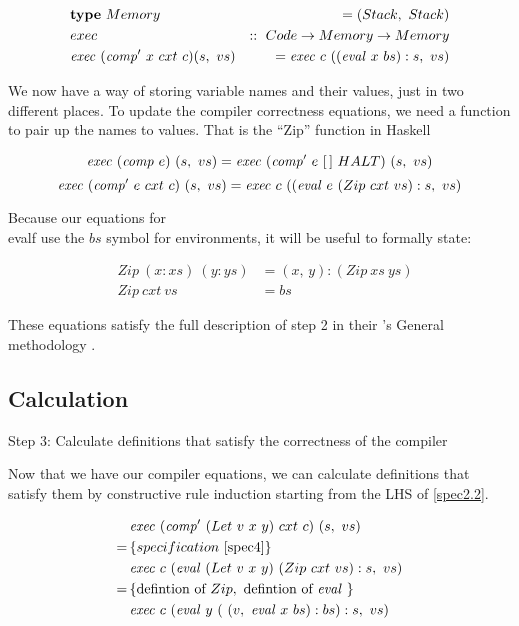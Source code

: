 \documentclass {article}
\begin{document}
\begin{eqnarray}
&\textbf{type}\ Memory\ &= (Stack,\ Stack)\\
&exec &::\ Code \rightarrow Memory \rightarrow Memory \nonumber \\
&\mathit{exec\ } (\mathit{comp'\ }  x\ cxt\ c) (s,\ vs) 
	&= \mathit{exec\ } c\ ((\mathit{eval\ }  x\ bs):s,\ vs) \label{spec4}
\end{eqnarray}

We now have a way of storing variable names
and their values, 
just in two different places.
To update the compiler correctness equations,
we need a function to pair up the names
to values.
That is the ``Zip'' function in Haskell

	\[ \mathit{exec\ } (\mathit{comp\ } e)\ (s,\ vs) 
		= \mathit{exec\ } (\mathit{comp'\ }  e\ [\,]\ HALT)\ (s,\ vs) \]
	\[ \mathit{exec\ } (\mathit{comp'\ }  e\ cxt\ c)\ (s,\ vs) 
		= \mathit{exec\ } c\ ((\mathit{eval\ }  e\ (Zip\ cxt\ vs):s,\ vs) \]

Because our equations for \\evalf 
use the $bs$ symbol for environments,
it will be useful to formally state:

\begin{eqnarray}
&Zip\ (x:xs)\ (y:ys) &= (x,\, y):(Zip\ xs\ ys)  \\ \label{ziden}
&Zip\ cxt\ vs &= bs \label{zcxtvs}
\end{eqnarray}
	
These equations satisfy the full description
of step 2 in their \BH's General methodology
\cite[page 42]{bandh}.


\subsection{Calculation}

Step 3: Calculate definitions that satisfy
	the correctness of the compiler

Now that we have our compiler equations,
we can calculate definitions that satisfy
them by constructive rule induction
starting from the LHS of \ref{spec2.2}\cite[pg 42]{bandh}.

\begin{align*}
	&\mathit{exec\ } (\mathit{comp'\ }  (Let\ v\ x\ y)\ cxt\ c)\ (s,\ vs) \\
	=\, & \{ specification\ \ref{spec4} \} \\
	&\mathit{exec\ } c\ (\mathit{eval\ }  (Let\ v\ x\ y)\ (Zip\ cxt\ vs):s,\ vs) \\
	=\, & \{\mbox{defintion of}\ Zip,\ \mbox{defintion of}\ \mathit{eval\ } \} \\
	&\mathit{exec\ } c\ (\mathit{eval\ }  y\ (\ (v,\ \mathit{eval\ }  x\ bs) :bs) : s,\ vs)
\end{align*}
\end{document}
